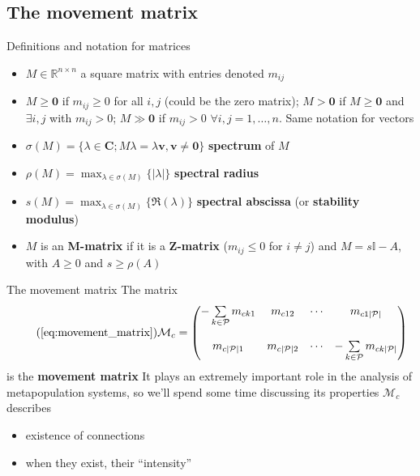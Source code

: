 \documentclass[aspectratio=43]{beamer}
\begin{document}
\subsection{The movement matrix}

\begin{frame}{Definitions and notation for matrices}
\begin{itemize}
	\item $M\in\mathbb{R}^{n\times n}$ a square matrix with entries denoted $m_{ij}$
	\vfill
	\item $M\geq\mathbf{0}$ if $m_{ij}\geq 0$ for all $i,j$ (could be the zero matrix); $M>\mathbf{0}$ if $M\geq\mathbf{0}$ and $\exists i,j$ with $m_{ij}>0$; $M\gg\mathbf{0}$ if $m_{ij}>0$ $\forall i,j=1,\ldots,n$. Same notation for vectors
	\vfill
	\item $\sigma(M)=\{\lambda\in\mathbf{C}; M\lambda=\lambda\mathbf{v}, \mathbf{v}\neq\mathbf{0}\}$ \textbf{spectrum} of $M$
	\vfill
	\item $\rho(M)=\max_{\lambda\in\sigma(M)}\{|\lambda|\}$ \textbf{spectral radius}
	\vfill
	\item $s(M)=\max_{\lambda\in\sigma(M)}\{\Re(\lambda)\}$ \textbf{spectral abscissa} (or \textbf{stability modulus})
	\vfill
	\item $M$ is an \textbf{M-matrix} if it is a \textbf{Z-matrix} ($m_{ij}\leq 0$ for $i\neq j$) and $M = s\mathbb{I}-A$, with $A\geq 0$ and $s\geq \rho(A)$
\end{itemize}
\end{frame}

\begin{frame}{The movement matrix}
	The matrix
	\begin{equation}\tag{\ref{eq:movement_matrix}}
		\mathcal{M}_c =
		\begin{pmatrix}
		-\sum\limits_{k\in\P}m_{ck1} & m_{c12} & \cdots & m_{c1|\P|} \\
		& & & \\
		m_{c|\P|1} & m_{c|\P|2} & \cdots & -\sum\limits_{k\in\P}m_{ck|\P|}
		\end{pmatrix}
	\end{equation}
	is the \textbf{movement matrix}
	\vfill
	It plays an extremely important role in the analysis of metapopulation systems, so we'll spend some time discussing its properties
	\vfill
$\mathcal{M}_c$ describes
\begin{itemize} 
\item existence of connections
\item when they exist, their ``intensity''
\end{itemize}
\end{frame}
\end{document}
